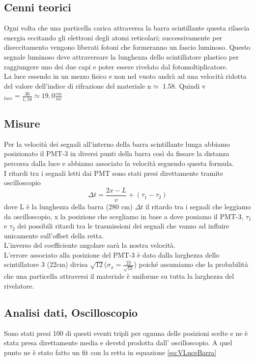 \documentclass[a4paper]{article}
\begin{document}
\subsection{Cenni teorici}
Ogni volta che una particella carica attraversa la barra scintillante questa rilascia energia eccitando gli elettroni degli atomi reticolari; successivamente per diseccitamento vengono liberati fotoni che formeranno un fascio luminoso. Questo segnale luminoso deve attraversare la lunghezza dello scintillatore plastico per raggiungere uno dei due capi e poter essere rivelato dal fotomoltiplicatore.\\
La luce essendo in un mezzo fisico e non nel vuoto andrà ad una velocità ridotta del valore dell'indice di rifrazione del materiale n$\simeq$ 1.58. Quindi v$_{luce} = \frac{30}{1,58} \simeq 19,0 \frac{cm}{ns}$

\subsection{Misure}
Per la velocità dei segnali all'interno della barra scintillante lunga abbiamo posizionato il PMT-3 in diversi punti della barra così da fissare la distanza percorsa dalla luce e abbiamo associato la velocità seguendo questa formula.\\
I ritardi tra i segnali letti dai PMT sono stati presi direttamente tramite oscilloscopio
\begin{equation}
\Delta t = \frac{2x-L}{v} + (\tau_1 - \tau_2)
\label{eq:VLuceBarra}
\end{equation}
dove L è la lunghezza della barra (280 cm) $\Delta t$ il ritardo tra i segnali che leggiamo da oscilloscopio, x la posizione che scegliamo in base a dove poniamo il PMT-3, $\tau_1$ e $\tau_2$ dei possibili ritardi tra le trasmissioni dei segnali che vanno ad influire unicamente sull'offset della retta.\\
L'inverso del coefficiente angolare sarà la nostra velocità.\\
L'errore associato alla posizione del PMT-3 è dato dalla larghezza dello scintillatore 3 (22cm) divisa $\sqrt{12}$($\sigma _x = \frac{22}{\sqrt{12}}$) poiché assumiamo che la probabilità che una particella attraversi il materiale è uniforme su tutta la larghezza del rivelatore.


\subsection{Analisi dati, Oscilloscopio}
Sono stati presi 100 di questi eventi tripli per ognuna delle posizioni scelte e ne è stata presa direttamente media e devstd prodotta dall' oscilloscopio. A quel punto ne è stato fatto un fit con la retta in equazione \ref{eq:VLuceBarra}
\end{document}
